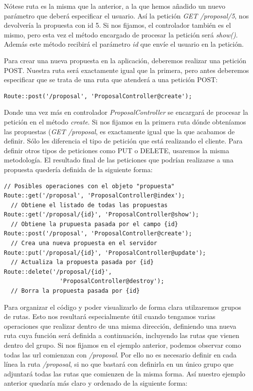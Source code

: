 Nótese  ruta es la misma que la anterior, a la que hemos añadido un nuevo parámetro que deberá especificar el usuario. Así la petición \textit{GET /proposal/5}, nos devolvería la propuesta con id 5. Si nos fijamos, el controlador también es el mismo, pero esta vez el método encargado de procesar la petición será \textit{show()}. Además este método recibirá el parámetro \textit{{id}} que envíe el usuario en la petición.

Para crear una nueva propuesta en la aplicación, deberemos realizar una petición POST. Nuestra ruta será exactamente igual que la primera, pero antes deberemos especificar que se trata de una ruta que atenderá a una petición POST:

\lstset{
  language        = php}
\begin{lstlisting}[frame=single]	
Route::post('/proposal', 'ProposalController@create');
\end{lstlisting}

Donde una vez más en controlador \textit{ProposalController} se encargará de procesar la petición en el método \textit{create}. Si nos fijamos en la primera ruta dónde obteníamos las propuestas (\textit{GET /proposal}, es exactamente igual que la que acabamos de definir. Sólo les diferencia el tipo de petición que está realizando el cliente. Para definir otros tipos de peticiones como PUT o DELETE, usaremos la misma metodología. El resultado final de las peticiones que podrían realizarse a una propuesta quedería definida de la siguiente forma:

\lstset{
  language        = php}
\begin{lstlisting}[frame=single]
// Posibles operaciones con el objeto "propuesta"
Route::get('/proposal', 'ProposalController@index');
  // Obtiene el listado de todas las propuestas
Route::get('/proposal/{id}', 'ProposalController@show');
  // Obtiene la prupuesta pasada por el campo {id}
Route::post('/proposal', 'ProposalController@create');
  // Crea una nueva propuesta en el servidor
Route::put('/proposal/{id}', 'ProposalController@update');
  // Actualiza la propuesta pasada por {id}
Route::delete('/proposal/{id}',
			    'ProposalController@destroy');
  // Borra la propuesta pasada por {id}
\end{lstlisting}

Para organizar el código y poder visualizarlo de forma clara utilzaremos grupos de rutas. Esto nos resultará especialmente útil cuando tengamos varias operaciones que realizar dentro de una misma dirección, definiendo una nueva ruta cuya función será definida a continuación, incluyendo las rutas que vienen dentro del grupo. Si nos fijamos en el ejemplo anterior, podemos observar como todas las url comienzan con \textit{/proposal}. Por ello no es necesario definir en cada línea la ruta \textit{/proposal}, si no que bastará con definirla en un único grupo que adjuntará todas las rutas que comienzen de la misma forma. Así nuestro ejemplo anterior quedaría más claro y ordenado de la siguiente forma:

